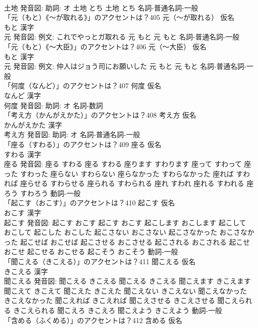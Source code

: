 \documentclass[8pt]{extreport}
\begin{document}
\begin{CJK}{UTF8}{min}
\\	土地 発音図: 助詞: オ	土地 とち		土地 とち				名詞-普通名詞-一般 
\\	「元（もと）《〜が取れる》」のアクセントは？405	元（〜が取れる） 仮名　
\\	もと 漢字　
\\	元 発音図: 例文: これでやっとガ取れる	元 もと		元 もと				名詞-普通名詞-一般 
\\	「元（もと）《〜大臣》」のアクセントは？406	元（〜大臣） 仮名　
\\	もと 漢字　
\\	元 発音図: 例文: 仲人はジョう司にお願いした	元 もと		元 もと				名詞-普通名詞-一般 
\\	「何度（なんど）」のアクセントは？407	何度 仮名　
\\	なんど 漢字　
\\	何度 発音図: 助詞: オ							名詞-数詞 
\\	「考え方（かんがえかた）」のアクセントは？408	考え方 仮名　
\\	かんがえかた 漢字　
\\	考え方 発音図: 助詞: オ							名詞-普通名詞-一般 
\\	「座る（すわる）」のアクセントは？409	座る 仮名　
\\	すわる 漢字　
\\	座る 発音図:	座る すわる		座る すわる 座ります すわります 座って すわって 座った すわった 座らない すわらない 座らなかった すわらなかった 座れば すわれば 座らせる すわらせる 座られる すわられる 座れ すわれ 座れる すわれる 座ろう すわろう				動詞-一般 
\\	「起こす（おこす）」のアクセントは？410	起こす 仮名　
\\	おこす 漢字　
\\	起こす 発音図:	起こす おこす		起こす おこす 起こします おこします 起こして おこして 起こした おこした 起こさない おこさない 起こさなかった おこさなかった 起こせば おこせば 起こさせる おこさせる 起こされる おこされる 起こせ おこせ 起こせる おこせる 起こそう おこそう				動詞-一般 
\\	「聞こえる（きこえる）」のアクセントは？411	聞こえる 仮名　
\\	きこえる 漢字　
\\	聞こえる 発音図:	聞こえる きこえる		聞こえる きこえる 聞こえます きこえます 聞こえて きこえて 聞こえた きこえた 聞こえない きこえない 聞こえなかった きこえなかった 聞こえれば きこえれば 聞こえさせる きこえさせる 聞こえられる きこえられる 聞こえろ きこえろ 聞こえよう きこえよう				動詞-一般 
\\	「含める（ふくめる）」のアクセントは？412	含める 仮名　

\end{CJK}
\end{document}
